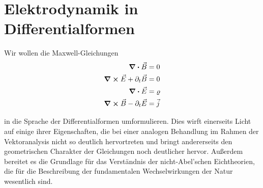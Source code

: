\section{Elektrodynamik in Differentialformen}
Wir wollen die Maxwell-Gleichungen
\begin{align}
\div{\vec{B}} &= 0 \\
\curl \vec{E} + \partial_t \vec{B} &= 0 \\
\div{\vec{E}} &= \varrho \\
\curl \vec{B} - \partial_t \vec{E} &= \vec{j}
\end{align} 

in die Sprache der Differentialformen umformulieren. Dies wirft einerseits Licht auf einige ihrer Eigenschaften, die bei einer analogen Behandlung im Rahmen der Vektoranalysis nicht so deutlich hervortreten und bringt andererseits den geometrischen Charakter der Gleichungen noch deutlicher hervor. Außerdem bereitet es die Grundlage für das Verständnis der nicht-Abel'schen Eichtheorien, die für die Beschreibung der fundamentalen Wechselwirkungen der Natur wesentlich sind.